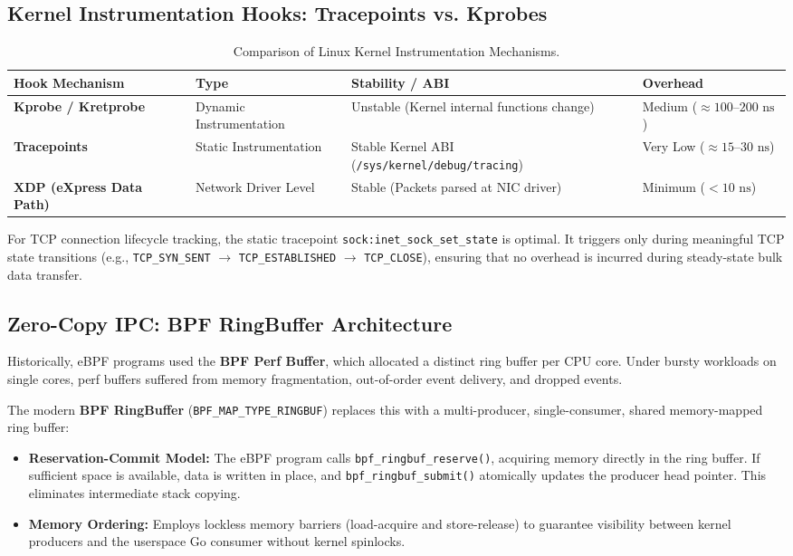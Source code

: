 \documentclass[11pt,a4paper]{article}
\begin{document}
\subsection{Kernel Instrumentation Hooks: Tracepoints vs. Kprobes}
\begin{table}[h!]
\centering
\small
\begin{tabular}{@{}llll@{}}
\toprule
\textbf{Hook Mechanism} & \textbf{Type} & \textbf{Stability / ABI} & \textbf{Overhead} \\ \midrule
\textbf{Kprobe / Kretprobe} & Dynamic Instrumentation & Unstable (Kernel internal functions change) & Medium ($\approx 100\text{--}200\text{ ns}$) \\
\textbf{Tracepoints} & Static Instrumentation & Stable Kernel ABI (\texttt{/sys/kernel/debug/tracing}) & Very Low ($\approx 15\text{--}30\text{ ns}$) \\
\textbf{XDP (eXpress Data Path)} & Network Driver Level & Stable (Packets parsed at NIC driver) & Minimum ($<10\text{ ns}$) \\
\bottomrule
\end{tabular}
\caption{Comparison of Linux Kernel Instrumentation Mechanisms.}
\label{tab:hooks}
\end{table}

For TCP connection lifecycle tracking, the static tracepoint \texttt{sock:inet\_sock\_set\_state} is optimal. It triggers only during meaningful TCP state transitions (e.g., \texttt{TCP\_SYN\_SENT} $\to$ \texttt{TCP\_ESTABLISHED} $\to$ \texttt{TCP\_CLOSE}), ensuring that no overhead is incurred during steady-state bulk data transfer.

\subsection{Zero-Copy IPC: BPF RingBuffer Architecture}
Historically, eBPF programs used the \textbf{BPF Perf Buffer}, which allocated a distinct ring buffer per CPU core. Under bursty workloads on single cores, perf buffers suffered from memory fragmentation, out-of-order event delivery, and dropped events.

The modern \textbf{BPF RingBuffer} (\texttt{BPF\_MAP\_TYPE\_RINGBUF}) replaces this with a multi-producer, single-consumer, shared memory-mapped ring buffer:
\begin{itemize}
    \item \textbf{Reservation-Commit Model:} The eBPF program calls \texttt{bpf\_ringbuf\_reserve()}, acquiring memory directly in the ring buffer. If sufficient space is available, data is written in place, and \texttt{bpf\_ringbuf\_submit()} atomically updates the producer head pointer. This eliminates intermediate stack copying.
    \item \textbf{Memory Ordering:} Employs lockless memory barriers (load-acquire and store-release) to guarantee visibility between kernel producers and the userspace Go consumer without kernel spinlocks.
\end{itemize}
\end{document}
